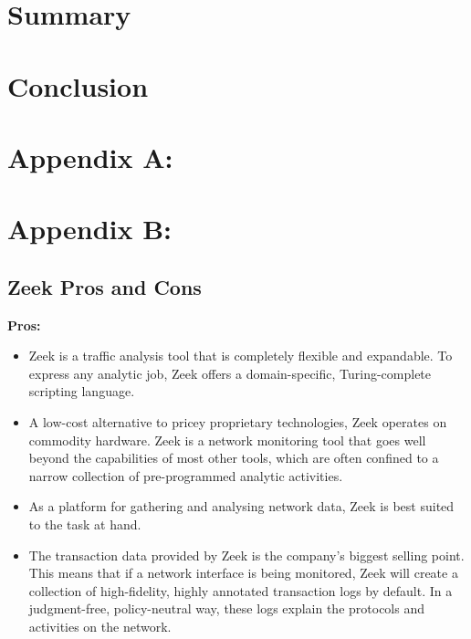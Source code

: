 \documentclass[conference]{IEEEtran}
\begin{document}
\newpage

\section{Summary}


\section{Conclusion}


\newpage

\section*{Appendix A:}





\newpage

\section*{Appendix B:}

\subsection{Zeek Pros and Cons} \label{prosncons}

{\bfseries{Pros:}}

\begin{itemize}
    \item Zeek is a traffic analysis tool that is completely flexible and expandable. To express any analytic job, Zeek offers a domain-specific, Turing-complete scripting language.
    \item A low-cost alternative to pricey proprietary technologies, Zeek operates on commodity hardware. Zeek is a network monitoring tool that goes well beyond the capabilities of most other tools, which are often confined to a narrow collection of pre-programmed analytic activities.
    \item As a platform for gathering and analysing network data, Zeek is best suited to the task at hand.
    \item The transaction data provided by Zeek is the company's biggest selling point. This means that if a network interface is being monitored, Zeek will create a collection of high-fidelity, highly annotated transaction logs by default. In a judgment-free, policy-neutral way, these logs explain the protocols and activities on the network.

\end{itemize}
\end{document}
